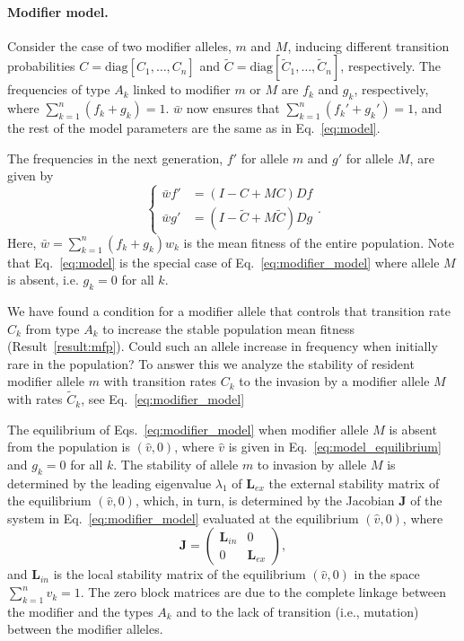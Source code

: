 \documentclass[9pt, a4paper, twocolumn]{extarticle}
\newcommand{\matrx}[1]{{\left[ \stackrel{}{#1}\right]}}
\newcommand{\diag}[1]{\mbox{diag}\matrx{#1}}
\newcommand{\cl}{\mathbf{L}}
\newcommand{\cj}{\mathbf{J}}
\begin{document}
\paragraph*{Modifier model.}
Consider the case of two modifier alleles, $m$ and $M$, inducing different transition probabilities $C=\diag{C_1, \ldots, C_n}$ and $\tilde{C}=\diag{\tilde{C}_1, \ldots, \tilde{C}_n}$, respectively.
The frequencies of type $A_k$ linked to modifier $m$ or $M$ are $f_k$ and $g_k$, respectively, where $\sum_{k=1}^{n}{(f_k + g_k)}=1$.
$\bar{w}$ now ensures that $\sum_{k=1}^{n}{(f_k' + g_k')}=1$, 
and the rest of the model parameters are the same as in Eq.~\ref{eq:model}.

The frequencies in the next generation, $f'$ for allele $m$ and $g'$ for allele $M$, are given by
\begin{equation}
\begin{cases}
\bar{w} f' &= (I-C+MC)D f \\
\bar{w} g' &= (I-\tilde{C}+M\tilde{C})D g
\end{cases}.
\label{eq:modifier_model}
\end{equation}
Here, $\bar{w}=\sum_{k=1}^{n}{(f_k + g_k) w_k}$ is the mean fitness of the entire population. 
Note that Eq.~\ref{eq:model} is the special case of Eq.~\ref{eq:modifier_model} where allele $M$ is absent, i.e. $g_k=0$ for all $k$.

We have found a condition for a modifier allele that controls that transition rate $C_k$ from type $A_k$ to increase the stable population mean fitness (Result~\ref{result:mfp}).
Could such an allele increase in frequency when initially rare in the population?
To answer this we analyze the stability of resident modifier allele $m$ with transition rates $C_k$ to the invasion by a modifier allele $M$ with rates $\tilde{C}_k$, see Eq.~\ref{eq:modifier_model}~\citep[for an introduction to \emph{evolutionary invasion analysis}, see][ch.~12]{Otto2007}

The equilibrium of Eqs.~\ref{eq:modifier_model} when modifier allele $M$ is absent from the population is $(\hat v,0)$, where $\hat v$ is given in Eq.~\ref{eq:model_equilibrium} and $g_k=0$ for all $k$. 
The stability of allele $m$ to invasion by allele $M$ is determined by the leading eigenvalue $\lambda_1$ of $\cl_{ex}$ the external stability matrix of the equilibrium $(\hat v,0)$, which, in turn, is determined by the Jacobian $\cj$ of the system in Eq.~\ref{eq:modifier_model} evaluated at the equilibrium $(\hat v,0)$, where
\begin{equation}
\cj = \begin{pmatrix}\cl_{in} & 0 \\ 0 & \cl_{ex} \end{pmatrix},
\end{equation}
and $\cl_{in}$ is the local stability matrix of the equilibrium $(\hat v,0)$ in the space $\sum_{k=1}^n{v_k}=1$.
The zero block matrices are due to the complete linkage between the modifier and the types $A_k$ and to the lack of transition (i.e., mutation) between the modifier alleles.
\end{document}
